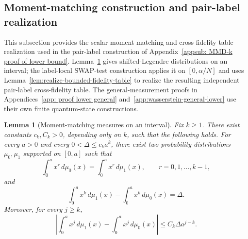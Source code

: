 \documentclass[aps,prx,reprint,superscriptaddress,amsmath,amssymb,longbibliography,floatfix]{revtex4-2}
\theoremstyle{plain}
\newtheorem{lemma}[theorem]{Lemma}
\theoremstyle{definition}
\theoremstyle{remark}
\begin{document}
\subsection{Moment-matching construction and pair-label realization}
\label{Appendix_worst_case_construction}

This subsection provides the scalar moment-matching and cross-fidelity-table
realization used in the pair-label construction of
Appendix~\ref{appsub: MMD-k proof of lower bound}.
Lemma~\ref{lem:moment-matching-interval} gives shifted-Legendre distributions
on an interval; the label-local SWAP-test construction applies it on
$[0,\alpha/N]$ and uses Lemma~\ref{lem:realize-bounded-fidelity-table}
to realize the resulting independent pair-label cross-fidelity table.
The general-measurement proofs in Appendices~\ref{app: proof lower general}
and~\ref{app:wasserstein-general-lower} use their own finite quantum-state
constructions.

\begin{lemma}[Moment-matching measures on an interval]
\label{lem:moment-matching-interval}
Fix $k\ge 1$. There exist constants $c_k,C_k>0$, depending only on $k$, such
that the following holds. For every $a>0$ and every $0<\Delta\le c_k a^k$,
there exist two probability distributions $\mu_0,\mu_1$ supported on $[0,a]$
such that
\begin{equation}
    \int_0^a x^r\, d\mu_0(x)
    =
    \int_0^a x^r\, d\mu_1(x),
    \qquad r=0,1,\dots,k-1,
\label{eq:app-interval-moment-matching}
\end{equation}
and
\begin{equation}
    \int_0^a x^k\, d\mu_1(x)
    -
    \int_0^a x^k\, d\mu_0(x)
    =
    \Delta.
\label{eq:app-interval-prescribed-moment-gap}
\end{equation}
Moreover, for every $j\ge k$,
\begin{equation}
    \left|
    \int_0^a x^j\, d\mu_1(x)
    -
    \int_0^a x^j\, d\mu_0(x)
    \right|
    \le
    C_k\Delta a^{j-k}.
\label{eq:app-interval-higher-moment-bound}
\end{equation}
\end{lemma}
\end{document}
